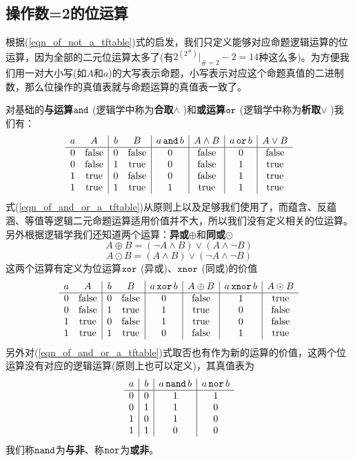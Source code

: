 \subsection*{操作数=2的位运算}
\par 根据(\ref{eqn_of_not_a_tftable})式的启发，我们只定义能够对应命题逻辑运算的位运算，因为全部的二元位运算太多了(有$2^{(2^\#)}|_{\#=2}-2=14$种这么多)。为方便我们用一对大小写(如$A$和$a$)的大写表示命题，小写表示对应这个命题真值的二进制数，那么位操作的真值表就与命题运算的真值表一致了。
\par 对基础的\textbf{与运算$\operatorname{\texttt{and}}$} (逻辑学中称为\textbf{合取$\land$} )和\textbf{或运算$\operatorname{\texttt{or}}$} (逻辑学中称为\textbf{析取$\lor$} )我们有：
\begin{equation}\label{eqn_of_and_or_a_tftable}
    \begin{array}{cc|cc|c|c|c|c}
        a&A&b&B&a\operatorname{\texttt{and}} b&A\land B&a\operatorname{\texttt{or}} b&A\lor B\\
        \hline
        0&\rm false&0&\rm false&0&\rm false&0&\rm false\\
        0&\rm false&1&\rm true&0&\rm false&1&\rm true\\
        1&\rm true&0&\rm false&0&\rm false&1&\rm true\\
        1&\rm true&1&\rm true&1&\rm true&1&\rm true
    \end{array}
\end{equation}
式(\ref{eqn_of_and_or_a_tftable})从原则上以及足够我们使用了，而蕴含、反蕴涵、等值等逻辑二元命题运算适用价值并不大，所以我们没有定义相关的位运算。另外根据逻辑学我们还知道两个运算：\textbf{异或$\oplus$}和\textbf{同或$\odot$}
$$A\oplus B=(\lnot A\land B)\lor(A\land\lnot B)$$
$$A\odot B=(A\land B)\lor(\lnot A\land\lnot B)$$
这两个运算有定义为位运算$\operatorname{\texttt{xor}}$ (异或)、$\operatorname{\texttt{xnor}}$ (同或)的价值
\begin{equation}\label{eqn_of_xor_xnor__a_tftable}
    \begin{array}{cc|cc|c|c|c|c}
        a&A&b&B&a\operatorname{\texttt{xor}} b&A\oplus B&a\operatorname{\texttt{xnor}} b&A\odot B\\
        \hline
        0&\rm false&0&\rm false&0&\rm false&1&\rm true\\
        0&\rm false&1&\rm true&1&\rm true&0&\rm false\\
        1&\rm true&0&\rm false&1&\rm true&0&\rm false\\
        1&\rm true&1&\rm true&0&\rm false&1&\rm true
    \end{array}
\end{equation}
另外对(\ref{eqn_of_and_or_a_tftable})式取否也有作为新的运算的价值，这两个位运算没有对应的逻辑运算(原则上也可以定义)，其真值表为
\begin{equation}\label{eqn_of_nor_nand__a_tftable}
    \begin{array}{c|c|c|c}
        a&b&a\operatorname{\texttt{nand}} b&a\operatorname{\texttt{nor}} b\\
        \hline
        0&0&1&1\\
        0&1&1&0\\
        1&0&1&0\\
        1&1&0&0
    \end{array}
\end{equation}
我们称$\operatorname{\texttt{nand}}$为\textbf{与非}、称$\operatorname{\texttt{nor}}$为\textbf{或非}。
